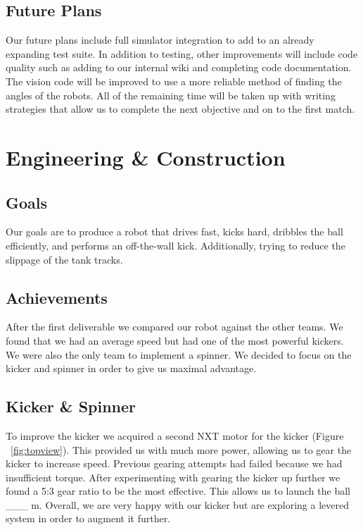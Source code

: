 \documentclass[12pt, a4paper, titlepage]{article}
\begin{document}
\subsection{Future Plans}

Our future plans include full simulator integration to add to an already
expanding test suite. In addition to testing, other improvements will
include code quality such as adding to our internal wiki and completing code
documentation. The vision code will be improved to use a more reliable method
of finding the angles of the robots. All of the remaining time will be taken up
with writing strategies that allow us to complete the next objective and on to
the first match.

\section{Engineering \& Construction}

\subsection{Goals}

Our goals are to produce a robot that drives fast, kicks hard, dribbles the ball
efficiently, and performs an off-the-wall kick. Additionally, trying to reduce the
slippage of the tank tracks.

\subsection{Achievements}

After the first deliverable we compared our robot against the other teams. We
found that we had an average speed but had one of the most powerful kickers.
We were also the only team to implement a spinner. We decided to focus on the
kicker and spinner in order to give us maximal advantage.

\subsection{Kicker \& Spinner}

To improve the kicker we acquired a second NXT motor for the kicker (Figure
~\ref{fig:topview}). This provided us with much more power, allowing us to gear
the kicker to increase speed. Previous gearing attempts had failed because we
had insufficient torque. After experimenting with gearing the kicker up further
we found a 5:3 gear ratio to be the most effective. This allows us to launch the
ball \_\_\_ m. Overall, we are very happy with our kicker but are exploring a
levered system in order to augment it further.
\end{document}
